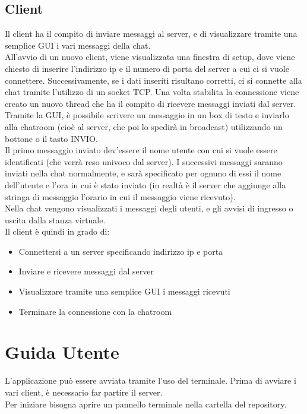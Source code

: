 \documentclass{article}
\begin{document}
\subsection{Client}
Il client ha il compito di inviare messaggi al server, e di visualizzare tramite una semplice GUI i vari messaggi della chat.\\
All'avvio di un nuovo client, viene visualizzata una finestra di setup, dove viene chiesto di inserire l'indirizzo ip e il numero di porta del server a cui ci si vuole connettere. Successivamente, se i dati inseriti risultano corretti, ci si connette alla chat tramite l'utilizzo di un socket TCP. Una volta stabilita la connessione viene creato un nuovo thread che ha il compito di ricevere messaggi inviati dal server.\\
Tramite la GUI, è possibile scrivere un messaggio in un box di testo e inviarlo alla chatroom (cioè al server, che poi lo spedirà in broadcast) utilizzando un bottone o il tasto INVIO.\\
Il primo messaggio inviato dev'essere il nome utente con cui si vuole essere identificati (che verrà reso univoco dal server). I successivi messaggi saranno inviati nella chat normalmente, e sarà specificato per ognuno di essi il nome dell'utente e l'ora in cui è stato inviato (in realtà è il server che aggiunge alla stringa di messaggio l'orario in cui il messaggio viene ricevuto).\\
Nella chat vengono visualizzati i messaggi degli utenti, e gli avvisi di ingresso o uscita dalla stanza virtuale.\\
\newline
Il client è quindi in grado di:
\begin{itemize}
    \item Connettersi a un server specificando indirizzo ip e porta
    \item Inviare e ricevere messaggi dal server
    \item Visualizzare tramite una semplice GUI i messaggi ricevuti
    \item Terminare la connessione con la chatroom
\end{itemize}

\newpage

\section{Guida Utente}
L'applicazione può essere avviata tramite l'uso del terminale. Prima di avviare i vari client, è necessario far partire il server.\\
Per iniziare bisogna aprire un pannello terminale nella cartella del repository.
\end{document}
